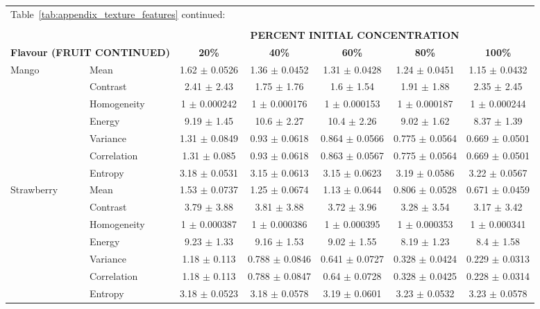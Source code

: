 \documentclass[authoryear]{elsarticle}
\begin{document}
	\begin{tabular}{llccccc}
	\multicolumn{4}{l}{Table~\ref{tab:appendix_texture_features} continued:}\\
	\multicolumn{4}{c}{}\\
	\toprule
    \multicolumn{1}{r}{} & & \multicolumn{5}{c}{\textbf{PERCENT INITIAL CONCENTRATION}} \\
		\multicolumn{2}{l}{\textbf{Flavour (FRUIT CONTINUED)}} & \textbf{20\%} & \textbf{40\%} & \textbf{60\%} & \textbf{80\%} & \textbf{100\%} \\
 \midrule
Mango & Mean & 1.62 $\pm$ 0.0526 & 1.36 $\pm$ 0.0452 & 1.31 $\pm$ 0.0428 & 1.24 $\pm$ 0.0451 & 1.15 $\pm$ 0.0432 \\
& Contrast & 2.41 $\pm$ 2.43 & 1.75 $\pm$ 1.76 & 1.6 $\pm$ 1.54 & 1.91 $\pm$ 1.88 & 2.35 $\pm$ 2.45 \\
& Homogeneity & 1 $\pm$ 0.000242 & 1 $\pm$ 0.000176 & 1 $\pm$ 0.000153 & 1 $\pm$ 0.000187 & 1 $\pm$ 0.000244 \\
& Energy & 9.19 $\pm$ 1.45 & 10.6 $\pm$ 2.27 & 10.4 $\pm$ 2.26 & 9.02 $\pm$ 1.62 & 8.37 $\pm$ 1.39 \\
& Variance & 1.31 $\pm$ 0.0849 & 0.93 $\pm$ 0.0618 & 0.864 $\pm$ 0.0566 & 0.775 $\pm$ 0.0564 & 0.669 $\pm$ 0.0501 \\
& Correlation & 1.31 $\pm$ 0.085 & 0.93 $\pm$ 0.0618 & 0.863 $\pm$ 0.0567 & 0.775 $\pm$ 0.0564 & 0.669 $\pm$ 0.0501 \\
& Entropy & 3.18 $\pm$ 0.0531 & 3.15 $\pm$ 0.0613 & 3.15 $\pm$ 0.0623 & 3.19 $\pm$ 0.0586 & 3.22 $\pm$ 0.0567 \\
	\midrule
Strawberry & Mean & 1.53 $\pm$ 0.0737 & 1.25 $\pm$ 0.0674 & 1.13 $\pm$ 0.0644 & 0.806 $\pm$ 0.0528 & 0.671 $\pm$ 0.0459 \\
& Contrast & 3.79 $\pm$ 3.88 & 3.81 $\pm$ 3.88 & 3.72 $\pm$ 3.96 & 3.28 $\pm$ 3.54 & 3.17 $\pm$ 3.42 \\
& Homogeneity & 1 $\pm$ 0.000387 & 1 $\pm$ 0.000386 & 1 $\pm$ 0.000395 & 1 $\pm$ 0.000353 & 1 $\pm$ 0.000341 \\
& Energy & 9.23 $\pm$ 1.33 & 9.16 $\pm$ 1.53 & 9.02 $\pm$ 1.55 & 8.19 $\pm$ 1.23 & 8.4 $\pm$ 1.58 \\
& Variance & 1.18 $\pm$ 0.113 & 0.788 $\pm$ 0.0846 & 0.641 $\pm$ 0.0727 & 0.328 $\pm$ 0.0424 & 0.229 $\pm$ 0.0313 \\
& Correlation & 1.18 $\pm$ 0.113 & 0.788 $\pm$ 0.0847 & 0.64 $\pm$ 0.0728 & 0.328 $\pm$ 0.0425 & 0.228 $\pm$ 0.0314 \\
& Entropy & 3.18 $\pm$ 0.0523 & 3.18 $\pm$ 0.0578 & 3.19 $\pm$ 0.0601 & 3.23 $\pm$ 0.0532 & 3.23 $\pm$ 0.0578 \\

\end{tabular}
\end{document}
